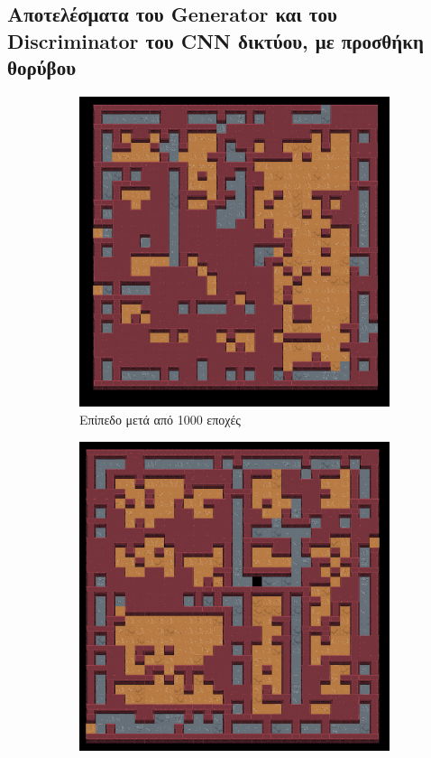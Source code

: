 \subsection{Αποτελέσματα του Generator και του Discriminator του CNN δικτύου, με προσθήκη θορύβου}
\begin{figure}[H]
\begin{subfigure}{.5\textwidth}
  \centering
  \includegraphics[width=.8\linewidth]{../images/result_images/cnn-gan-with-fuzzy/combined_1000.png}
  \caption{Επίπεδο μετά από 1000 εποχές}
  \label{fig:sfig1}
\end{subfigure}%
\begin{subfigure}{.5\textwidth}
  \centering
  \includegraphics[width=.8\linewidth]{../images/result_images/cnn-gan-with-fuzzy/combined_3000.png}

\end{subfigure}
\end{figure}
